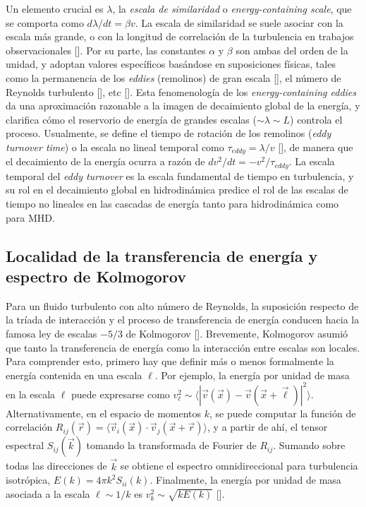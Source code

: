 Un elemento crucial es $\lambda$, la \textit{escala de similaridad} o
\textit{energy-containing scale}, que se comporta como $d\lambda/dt =
\beta v$. La escala de similaridad se suele asociar con la escala más
grande, o con la longitud de correlación de la turbulencia en trabajos
observacionales [\cite{batchelor_theory_1953}].  Por su parte, las
constantes $\alpha$ y $\beta$ son ambas del orden de la unidad, y
adoptan valores específicos basándose en suposiciones físicas, tales
como la permanencia de los \textit{eddies} (remolinos) de gran escala
[\cite{kolmogorov_energy-scattering_1941}], el número de Reynolds
turbulento [\cite{von_karman_concept_1949}], etc
[\cite{orszag_analytical_1970,matthaeus_anisotropic_1996}]. Esta
fenomenología de los \textit{energy-containing eddies} da una
aproximación razonable a la imagen de decaimiento global de la
energía, y clarifica cómo el reservorio de energía de grandes escalas
($\sim \lambda \sim L$) controla el proceso. Usualmente, se define el
tiempo de rotación de los remolinos (\textit{eddy turnover time}) o la
escala no lineal temporal como $\tau_{eddy} = \lambda/v$
[\cite{rose_fully_1978}], de manera que el decaimiento de la energía
ocurra a razón de $dv^2/dt = -v^2/\tau_{eddy}$. La escala temporal del
\textit{eddy turnover} es la escala fundamental de tiempo en
turbulencia, y su rol en el decaimiento global en hidrodinámica
predice el rol de las escalas de tiempo no lineales en las cascadas de
energía tanto para hidrodinámica como para MHD.

\subsection{Localidad de la transferencia de energía y espectro de Kolmogorov}

Para un fluido turbulento con alto número de Reynolds, la suposición
respecto de la tríada de interacción y el proceso de transferencia de
energía conducen hacia la famosa ley de escalas $-5/3$ de Kolmogorov
[\cite{batchelor_theory_1953, kolmogorov_local_1941}]. Brevemente,
Kolmogorov asumió que tanto la transferencia de energía como la
interacción entre escalas son locales. Para comprender esto, primero
hay que definir más o menos formalmente la energía contenida en una
escala $\ell$. Por ejemplo, la energía por unidad de masa en la escala
$\ell$ puede expresarse como
$v_\ell^2 \sim \langle |\vec{v}(\vec{x}) -
\vec{v}(\vec{x}+\vec{\ell})|^2\rangle$. Alternativamente, en el
espacio de momentos $k$, se puede computar la función de correlación
$R_{ij}(\vec{r}) = \langle\vec{v}_i(\vec{x}) \cdot
\vec{v}_j(\vec{x}+\vec{r})\rangle$, y a partir de ahí, el tensor
espectral $S_{ij}(\vec{k})$ tomando la transformada de Fourier de
$R_{ij}$. Sumando sobre todas las direcciones de $\vec{k}$ se obtiene
el espectro omnidireccional para turbulencia isotrópica, $E(k) = 4\pi
k^2 S_{ii}(k)$. Finalmente, la energía por unidad de masa asociada a
la escala $\ell \sim 1/k$ es $v_k^2 \sim \sqrt{kE(k)}$
[\cite{batchelor_theory_1953}].

